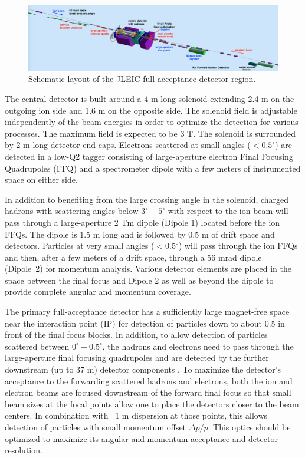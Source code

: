 \begin{figure}[!htb]
\centering
\includegraphics[width=.75\textwidth]{../../img/detector_schematic2.png}
\caption{Schematic layout of the JLEIC full-acceptance detector region.}
\label{fig:detector_schematic}
\end{figure}

The central detector is built around a 4 m long solenoid extending 2.4 m on the outgoing ion side and 1.6 m on the opposite side. The solenoid field is adjustable independently of the beam energies in order to optimize the detection for various processes. The maximum field is expected to be 3 T. The solenoid is surrounded by 2 m long detector end caps. Electrons scattered at small angles ($<0.5^{\circ}$) are detected in a low-Q2 tagger consisting of large-aperture electron Final Focusing Quadrupoles (FFQ) and a spectrometer dipole with a few meters of instrumented space on either side.

In addition to benefiting from the large crossing angle in the solenoid, charged hadrons with scattering angles below $3^{\circ}-5^{\circ}$ with respect to the ion beam will pass through a large-aperture 2 Tm dipole (Dipole 1) located before the ion FFQs. The dipole is 1.5 m long and is followed by 0.5 m of drift space and detectors. Particles at very small angles ($<0.5^{\circ}$)  will pass through the ion FFQs and then, after a few meters of a drift space, through a 56 mrad dipole (Dipole 2) for momentum analysis. Various detector elements are placed in the space between the final focus and Dipole 2 as well as beyond the dipole to provide complete angular and momentum coverage.

The primary full-acceptance detector has a sufficiently large magnet-free space near the interaction point (IP) for detection of particles down to about 0.5 in front of the final focus blocks. In addition, to allow detection of particles scattered between $0^{\circ}-0.5^{\circ}$, the hadrons and electrons need to pass through the large-aperture final focusing quadrupoles and are detected by the further downstream (up to 37 m) detector components \cite{Abeyratne:2012ah} \cite{Abeyratne:2015pma}  \cite{Lin} \cite{Morozov:2012} \cite{Morozov:2014}. 
To maximize the detector’s acceptance to the forwarding scattered hadrons and electrons, both the ion and electron beams are focused downstream of the forward final focus so that small beam sizes at the focal points allow one to place the detectors closer to the beam centers. In combination with ~1 m dispersion at those points, this allows detection of particles with small momentum offset $\Delta p/p$. This optics should be optimized to maximize its angular and momentum acceptance and detector resolution. 

